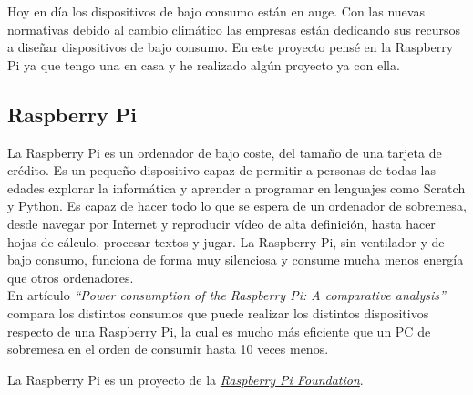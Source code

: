 Hoy en día los dispositivos de bajo consumo están en auge.
Con las nuevas normativas debido al cambio climático las empresas están dedicando sus recursos a diseñar dispositivos de bajo consumo. 
En este proyecto pensé en la Raspberry Pi ya que tengo una en casa y he realizado algún proyecto ya con ella.

\subsection{Raspberry Pi}

La Raspberry Pi \cite{raspPi} es un ordenador de bajo coste, del tamaño de una tarjeta de crédito. Es un pequeño dispositivo capaz de permitir a personas de todas las edades explorar la informática y aprender a programar en lenguajes como Scratch y Python. Es capaz de hacer todo lo que se espera de un ordenador de sobremesa, desde navegar por Internet y reproducir vídeo de alta definición, hasta hacer hojas de cálculo, procesar textos y jugar. La Raspberry Pi, sin ventilador y de bajo consumo, funciona de forma muy silenciosa y consume mucha menos energía que otros ordenadores.\\

En artículo \textit{``Power consumption of the Raspberry Pi: A comparative analysis''} \cite{art:raspicomsuptiom} compara los distintos consumos que puede realizar los distintos dispositivos respecto de una Raspberry Pi, la cual es mucho más eficiente que un PC de sobremesa en el orden de consumir hasta 10 veces menos.


La Raspberry Pi es un proyecto de la \href{https://www.raspberrypi.org/about/}{\textit{Raspberry Pi Foundation}}.\\











